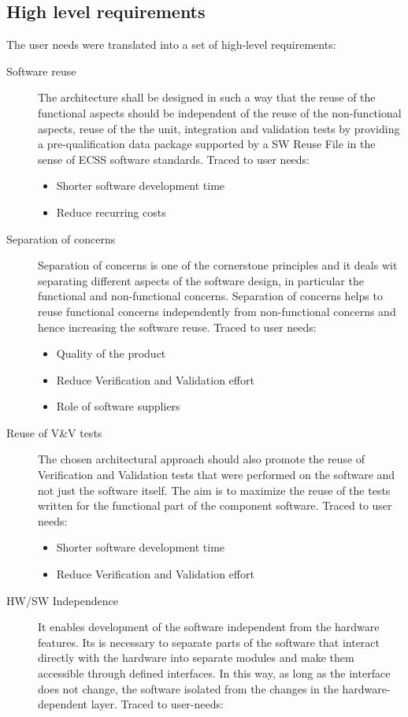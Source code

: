 \subsection*{High level requirements}
The user needs were translated into a set of high-level requirements:
\begin{description}
\item [Software reuse] The architecture shall be designed in such a way that the reuse of the functional aspects should be independent of the reuse of the non-functional aspects, reuse of the the unit, integration and validation tests by providing  a pre-qualification data package supported by a SW Reuse File in the sense of ECSS software standards. Traced to user needs:
\begin{itemize}
\item Shorter software development time
\item Reduce recurring costs
\end{itemize} 
\item [Separation of concerns] Separation of concerns is one of the cornerstone principles and it deals wit separating different aspects of the software design, in particular the functional and non-functional concerns. Separation of concerns helps to reuse functional concerns independently from non-functional concerns and hence increasing the software reuse. Traced to user needs:
\begin{itemize}
\item Quality of the product
\item Reduce Verification and Validation effort
\item Role of software suppliers 
\end{itemize}  
\item [Reuse of V\&V tests] The chosen architectural approach should also promote the reuse of Verification and Validation tests that were performed on the software and not just the software itself. The aim is to maximize the reuse of the tests written for the functional part of the component software. Traced to user needs:
\begin{itemize}
\item Shorter software development time
\item Reduce Verification and Validation effort 
\end{itemize}
\item [HW/SW Independence] It enables development of the software independent from the hardware features. Its is necessary to separate parts of the software that interact directly with the hardware into separate modules and make them accessible through defined interfaces. In this way, as long as the interface does not change, the software isolated from the changes in the hardware-dependent layer. Traced to user-needs:

\end{description}
